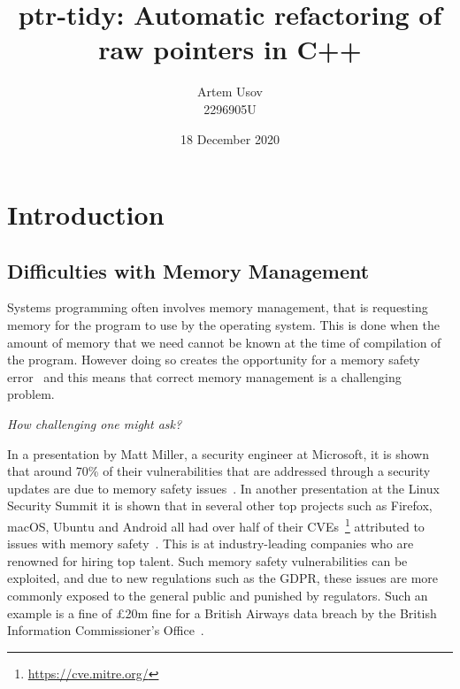 \documentclass{proposal}
\begin{document}




    \title{ptr-tidy: Automatic refactoring of raw pointers in C++}
    \author{Artem Usov\\ 2296905U}
    \date{18 December 2020}
    \maketitle
    \tableofcontents
    \newpage




    \section{Introduction}\label{sec:intro}

    \subsection{Difficulties with Memory Management}\label{subsec:difficulties-with-memory-management}

    Systems programming often involves memory management, that is requesting memory for the program to use by the operating system.
    This is done when the amount of memory that we need cannot be known at the time of compilation of the program.
    However doing so creates the opportunity for a memory safety error~\cite{Dhurjati2003} and this means that correct memory management is a challenging problem.

    \emph{How challenging one might ask?}

    In a presentation by Matt Miller, a security engineer at Microsoft, it is shown that around 70\% of their vulnerabilities that are addressed through a security updates are due to memory safety issues~\cite{Miller2019}.
    In another presentation at the Linux Security Summit it is shown that in several other top projects such as Firefox, macOS, Ubuntu and Android all had over half of their CVEs~\footnote{\url{https://cve.mitre.org/}} attributed to issues with memory safety~\cite{Gaynor2020}.
    This is at industry-leading companies who are renowned for hiring top talent.
    Such memory safety vulnerabilities can be exploited, and due to new regulations such as the GDPR, these issues are more commonly exposed to the general public and punished by regulators.
    Such an example is a fine of £20m fine for a British Airways data breach by the British Information Commissioner's Office~\cite{ICO2020}.
\end{document}
